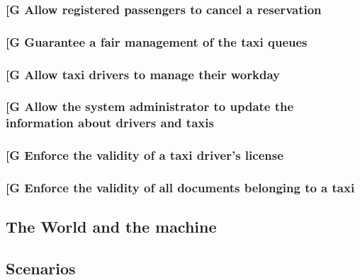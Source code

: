 \documentclass[a4paper,12pt]{article}%
\newcounter{goals_counter}
\begin{document}
\subsubsection{\label{goal\arabic{goals_counter}}{[}G\arabic{goals_counter}{]} Allow registered passengers to cancel a reservation}
\subsubsection{\label{goal\arabic{goals_counter}}{[}G\arabic{goals_counter}{]} Guarantee a fair management of the taxi queues}
\subsubsection{\label{goal\arabic{goals_counter}}{[}G\arabic{goals_counter}{]} Allow taxi drivers to manage their workday}
\subsubsection{\label{goal\arabic{goals_counter}}{[}G\arabic{goals_counter}{]} Allow the system administrator to update the information about drivers and taxis}
\subsubsection{\label{goal\arabic{goals_counter}}{[}G\arabic{goals_counter}{]} Enforce the validity of a taxi driver's license}
\subsubsection{\label{goal\arabic{goals_counter}}{[}G\arabic{goals_counter}{]} Enforce the validity of all  documents belonging to a taxi}
\subsection{The World and the machine}
\subsection{Scenarios}
\end{document}
